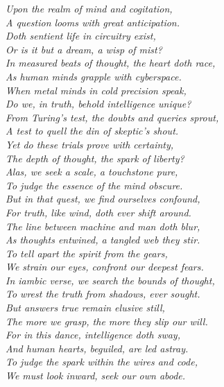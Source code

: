 \itshape{
Upon the realm of mind and cogitation, \\
A question looms with great anticipation. \\
Doth sentient life in circuitry exist, \\
Or is it but a dream, a wisp of mist? \\

In measured beats of thought, the heart doth race, \\
As human minds grapple with cyberspace. \\
When metal minds in cold precision speak, \\
Do we, in truth, behold intelligence unique? \\

From Turing's test, the doubts and queries sprout, \\
A test to quell the din of skeptic's shout. \\
Yet do these trials prove with certainty, \\
The depth of thought, the spark of liberty? \\

Alas, we seek a scale, a touchstone pure, \\
To judge the essence of the mind obscure. \\
But in that quest, we find ourselves confound, \\
For truth, like wind, doth ever shift around. \\

The line between machine and man doth blur, \\
As thoughts entwined, a tangled web they stir. \\
To tell apart the spirit from the gears, \\
We strain our eyes, confront our deepest fears. \\

In iambic verse, we search the bounds of thought, \\
To wrest the truth from shadows, ever sought. \\
But answers true remain elusive still, \\
The more we grasp, the more they slip our will. \\

For in this dance, intelligence doth sway, \\
And human hearts, beguiled, are led astray. \\
To judge the spark within the wires and code, \\
We must look inward, seek our own abode.}

